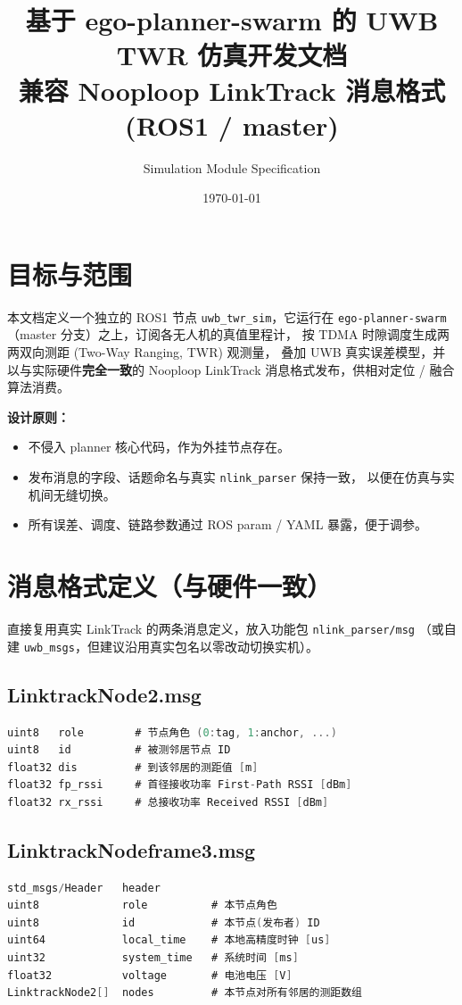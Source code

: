 \documentclass[11pt,a4paper]{article}
\title{\textbf{基于 ego-planner-swarm 的 UWB TWR 仿真开发文档}\\
\large 兼容 Nooploop LinkTrack 消息格式 (ROS1 / master)}
\author{Simulation Module Specification}
\date{\today}
\begin{document}
\maketitle
\tableofcontents
\bigskip

\section{目标与范围}
本文档定义一个独立的 ROS1 节点 \texttt{uwb\_twr\_sim}，它运行在
\texttt{ego-planner-swarm}（master 分支）之上，订阅各无人机的真值里程计，
按 TDMA 时隙调度生成两两双向测距 (Two-Way Ranging, TWR) 观测量，
叠加 UWB 真实误差模型，并以与实际硬件\textbf{完全一致}的 Nooploop
LinkTrack 消息格式发布，供相对定位 / 融合算法消费。

\textbf{设计原则：}
\begin{itemize}[leftmargin=1.4em]
  \item 不侵入 planner 核心代码，作为外挂节点存在。
  \item 发布消息的字段、话题命名与真实 \texttt{nlink\_parser} 保持一致，
        以便在仿真与实机间无缝切换。
  \item 所有误差、调度、链路参数通过 ROS param / YAML 暴露，便于调参。
\end{itemize}

\section{消息格式定义（与硬件一致）}
直接复用真实 LinkTrack 的两条消息定义，放入功能包 \texttt{nlink\_parser/msg}
（或自建 \texttt{uwb\_msgs}，但建议沿用真实包名以零改动切换实机）。

\subsection{LinktrackNode2.msg}
\begin{lstlisting}[language=C]
uint8   role        # 节点角色 (0:tag, 1:anchor, ...)
uint8   id          # 被测邻居节点 ID
float32 dis         # 到该邻居的测距值 [m]
float32 fp_rssi     # 首径接收功率 First-Path RSSI [dBm]
float32 rx_rssi     # 总接收功率 Received RSSI [dBm]
\end{lstlisting}

\subsection{LinktrackNodeframe3.msg}
\begin{lstlisting}[language=C]
std_msgs/Header   header
uint8             role          # 本节点角色
uint8             id            # 本节点(发布者) ID
uint64            local_time    # 本地高精度时钟 [us]
uint32            system_time   # 系统时间 [ms]
float32           voltage       # 电池电压 [V]
LinktrackNode2[]  nodes         # 本节点对所有邻居的测距数组
\end{lstlisting}
\end{document}
